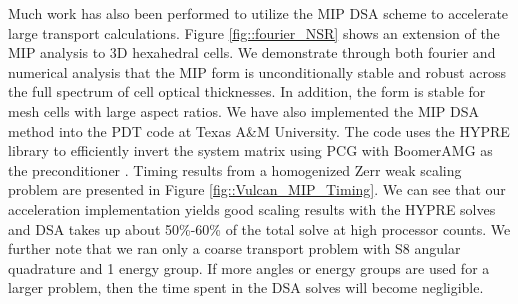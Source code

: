 \documentclass[11pt]{article}
\begin{document}
Much work has also been performed to utilize the MIP DSA scheme to accelerate large transport calculations. Figure \ref{fig::fourier_NSR} shows an extension of the MIP analysis to 3D hexahedral cells. We demonstrate through both fourier and numerical analysis that the MIP form is unconditionally stable and robust across the full spectrum of cell optical thicknesses. In addition, the form is stable for mesh cells with large aspect ratios. We have also implemented the MIP DSA method into the PDT code at Texas A\&M University. The code uses the HYPRE library to efficiently invert the system matrix using PCG with BoomerAMG as the preconditioner \cite{ref::hypre,yang2002boomeramg}. Timing results from a homogenized Zerr weak scaling problem are presented in Figure \ref{fig::Vulcan_MIP_Timing}. We can see that our acceleration implementation yields good scaling results with the HYPRE solves and DSA takes up about 50\%-60\% of the total solve at high processor counts. We further note that we ran only a coarse transport problem with S8 angular quadrature and 1 energy group. If more angles or energy groups are used for a larger problem, then the time spent in the DSA solves will become negligible.
\end{document}
